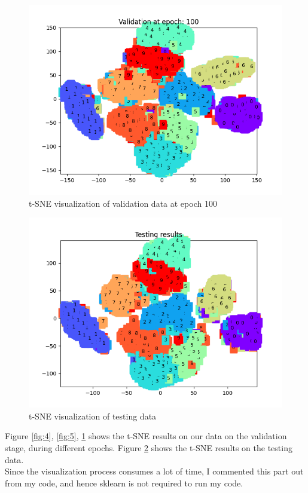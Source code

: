 \documentclass{article}
\begin{document}
    \begin{figure}
        \includegraphics[scale=0.6]{Validation at epoch: 100.png}
        \centering
        \caption{t-SNE visualization of validation data at epoch 100} \label{fig:6}
    \end{figure}
    \begin{figure}
        \includegraphics[scale=0.6]{Testing results.png}
        \centering
        \caption{t-SNE visualization of testing data} \label{fig:7}
    \end{figure}
    Figure \ref{fig:4}, \ref{fig:5}, \ref{fig:6} shows the t-SNE results on our
    data on the validation stage, during different epochs. Figure \ref{fig:7}
    shows the t-SNE results on the testing data. \\
    Since the visualization process consumes a lot of time, I commented this part out from my 
    code, and hence sklearn is not required to run my code.
\end{document}
